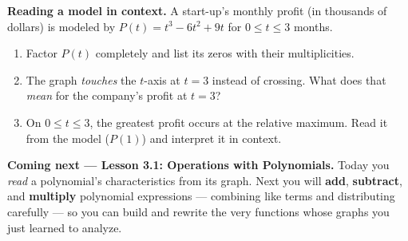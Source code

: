 \documentclass[10pt]{article}
\begin{document}
\begin{extensionbox}
\textbf{Reading a model in context.} A start-up's monthly profit (in thousands of dollars) is
modeled by $P(t) = t^3 - 6t^2 + 9t$ for $0 \le t \le 3$ months.
\begin{enumerate}[label=(\alph*), leftmargin=1.8em, itemsep=5pt]
  \item Factor $P(t)$ completely and list its zeros with their multiplicities.
  \item The graph \emph{touches} the $t$-axis at $t=3$ instead of crossing. What does that
        \emph{mean} for the company's profit at $t=3$?
  \item On $0\le t\le 3$, the greatest profit occurs at the relative maximum. Read it from the model
        ($P(1)$) and interpret it in context.
\end{enumerate}
\end{extensionbox}

\begin{spiralbox}
\textbf{Coming next --- Lesson 3.1: Operations with Polynomials.} Today you \emph{read} a
polynomial's characteristics from its graph. Next you will \textbf{add}, \textbf{subtract}, and
\textbf{multiply} polynomial expressions --- combining like terms and distributing carefully --- so
you can build and rewrite the very functions whose graphs you just learned to analyze.
\end{spiralbox}
\end{document}
